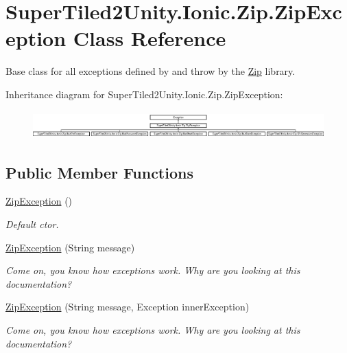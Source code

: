 \hypertarget{class_super_tiled2_unity_1_1_ionic_1_1_zip_1_1_zip_exception}{}\section{Super\+Tiled2\+Unity.\+Ionic.\+Zip.\+Zip\+Exception Class Reference}
\label{class_super_tiled2_unity_1_1_ionic_1_1_zip_1_1_zip_exception}


Base class for all exceptions defined by and throw by the \mbox{\hyperlink{namespace_super_tiled2_unity_1_1_ionic_1_1_zip}{Zip}} library.  


Inheritance diagram for Super\+Tiled2\+Unity.\+Ionic.\+Zip.\+Zip\+Exception\+:\begin{figure}[H]
\begin{center}
\leavevmode
\includegraphics[height=1.087379cm]{class_super_tiled2_unity_1_1_ionic_1_1_zip_1_1_zip_exception}
\end{center}
\end{figure}
\subsection*{Public Member Functions}
\begin{DoxyCompactItemize}
\item 
\mbox{\hyperlink{class_super_tiled2_unity_1_1_ionic_1_1_zip_1_1_zip_exception_a0fcf97ad85d524e883636821dcb542e3}{Zip\+Exception}} ()
\begin{DoxyCompactList}\small\item\em Default ctor. \end{DoxyCompactList}\item 
\mbox{\hyperlink{class_super_tiled2_unity_1_1_ionic_1_1_zip_1_1_zip_exception_a80b2bbc0b213fa5891ab27fe541e0f79}{Zip\+Exception}} (String message)
\begin{DoxyCompactList}\small\item\em Come on, you know how exceptions work. Why are you looking at this documentation? \end{DoxyCompactList}\item 
\mbox{\hyperlink{class_super_tiled2_unity_1_1_ionic_1_1_zip_1_1_zip_exception_a48963d6136e7f97071cd253bc20f68dc}{Zip\+Exception}} (String message, Exception inner\+Exception)
\begin{DoxyCompactList}\small\item\em Come on, you know how exceptions work. Why are you looking at this documentation? \end{DoxyCompactList}\end{DoxyCompactItemize}
